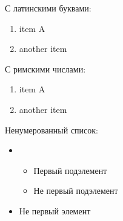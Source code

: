 \documentclass[a4paper, 12pt]{article}
\renewcommand{\labelitemi}{\$} %
\renewcommand{\labelitemii}{$\int$} %
\begin{document}
    С латинскими буквами:

    \begin{enumerate} [label=\Alph*] %
        \item item A
        \setcounter{enumi}{5}
        \item another item %
    \end{enumerate}
    

    С римскими числами:

    \begin{enumerate} [label=\Roman*] %
        \item item A
        \setcounter{enumi}{5}
        \item another item %
    \end{enumerate}



    Ненумерованный список:
    
    \begin{itemize}
        \item \begin{itemize}
            \item Первый подэлемент %
            \item Не первый подэлемент %
        \end{itemize}
        \item Не первый элемент %
    \end{itemize}
\end{document}
